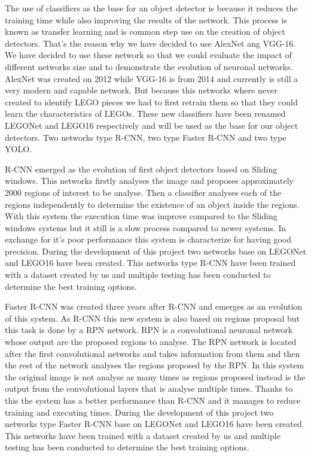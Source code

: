 {The use of classifiers as the base for an object detector is because it reduces the training time while also improving the results of the network. This process is known as transfer learning and is common step use on the creation of object detectors. That's the reason why we have decided to use AlexNet ang VGG-16. We have decided to use these network so that we could evaluate the impact of different networks size and to demonstrate the evolution of neuronal networks. AlexNet was created on 2012 while VGG-16 is from 2014 and currently is still a very modern and capable network. But because this networks where never created to identify LEGO pieces we had to first retrain them so that they could learn the characteristics of LEGOs. These new classifiers have been renamed LEGONet and LEGO16 respectively and will be used as the base for our object detectors. Two networks type R-CNN, two type Faster R-CNN and two type YOLO.

R-CNN emerged as the evolution of first object detectors based on Sliding windows. This networks firstly analyses the image and proposes approximately 2000 regions of interest to be analyse. Then a classifier analyses each of the regions independently to determine the existence of an object inside the regions. With this system the execution time was improve compared to the Sliding windows systems but it still is a slow process compared to newer systems. In exchange for it's poor performance this system is characterize for having good precision. During the development of this project two networks base on LEGONet and LEGO16 have been created. This networks type R-CNN have been trained with a dataset created by us and multiple testing has been conducted to determine the best training options.

Faster R-CNN was created three years after R-CNN and emerges as an evolution of this system. As R-CNN this new system is also based on regions proposal but this task is done by a RPN network. RPN is a convolutional neuronal network whose output are the proposed regions to analyse. The RPN network is located after the first convolutional networks and takes information from them and then the rest of the network analyses the regions proposed by the RPN. In this system the original image is not analyse as many times as regions proposed instead is the output from the convolutional layers that is analyse multiple times. Thanks to this the system has a better performance than R-CNN and it manages to reduce training and executing times. During the development of this project two networks type Faster R-CNN base on LEGONet and LEGO16 have been created. This networks have been trained with a dataset created by us and multiple testing has been conducted to determine the best training options.

}
